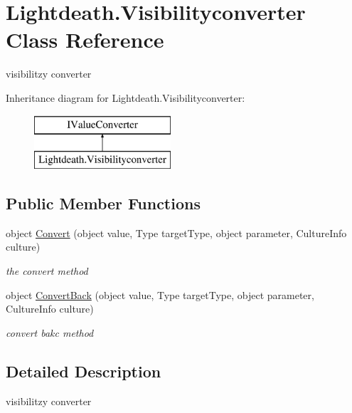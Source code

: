 \hypertarget{class_lightdeath_1_1_visibilityconverter}{}\section{Lightdeath.\+Visibilityconverter Class Reference}
\label{class_lightdeath_1_1_visibilityconverter}


visibilitzy converter  


Inheritance diagram for Lightdeath.\+Visibilityconverter\+:\begin{figure}[H]
\begin{center}
\leavevmode
\includegraphics[height=2.000000cm]{class_lightdeath_1_1_visibilityconverter}
\end{center}
\end{figure}
\subsection*{Public Member Functions}
\begin{DoxyCompactItemize}
\item 
object \hyperlink{class_lightdeath_1_1_visibilityconverter_afc6e2969f14a43104e0d81c6bbdc8eda}{Convert} (object value, Type target\+Type, object parameter, Culture\+Info culture)
\begin{DoxyCompactList}\small\item\em the convert method \end{DoxyCompactList}\item 
object \hyperlink{class_lightdeath_1_1_visibilityconverter_a3e91baa9f309c55afce48bf48e3ad0d4}{Convert\+Back} (object value, Type target\+Type, object parameter, Culture\+Info culture)
\begin{DoxyCompactList}\small\item\em convert bakc method \end{DoxyCompactList}\end{DoxyCompactItemize}


\subsection{Detailed Description}
visibilitzy converter 



